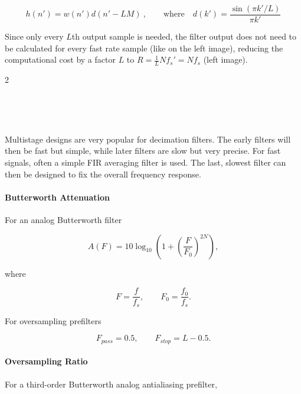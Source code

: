 \begin{equation*}
	h(n') = w(n') d(n'-LM) \:,\qquad \text{where} \quad
	d(k') = \frac{\sin(\pi k'/L)}{\pi k'}
\end{equation*}

Since only every $L$th output sample is needed, the filter output does
not need to be calculated for every fast rate sample (like on the left image),
reducing the computational cost by a factor $L$ to
$R = \frac{1}{L} N f_s' = N f_s$ (left image). \\

\begin{multicols}{2}
	\begin{center}
		 \\
	\end{center}
\vfill\columnbreak
	\begin{center}
		 \\
	\end{center}
\end{multicols}

Multistage designs are very popular for decimation filters. The early filters will
then be fast but simple, while later filters are slow but very precise. For fast
signals, often a simple FIR averaging filter is used. The last, slowest filter
can then be designed to fix the overall frequency response.
\paragraph{Butterworth Attenuation}

For an analog Butterworth filter

\[
A(F)
=
10\log_{10}
\!\left(
1+
\left(\frac{F}{F_0}\right)^{2N}
\right),
\]

where

\[
F=\frac{f}{f_s},
\qquad
F_0=\frac{f_0}{f_s}.
\]

For oversampling prefilters

\[
F_{pass}=0.5,
\qquad
F_{stop}=L-0.5.
\]

\paragraph{Oversampling Ratio}

For a third-order Butterworth analog antialiasing prefilter,

